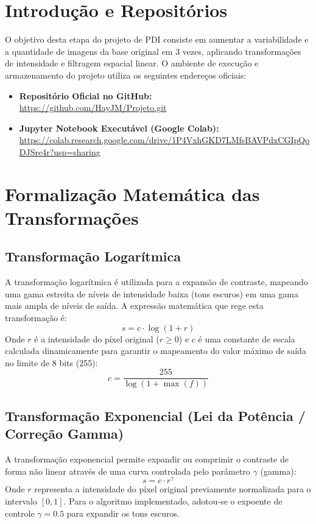\section{Introdução e Repositórios}
O objetivo desta etapa do projeto de PDI consiste em aumentar a variabilidade e a quantidade de imagens da base original em 3 vezes, aplicando transformações de intensidade e filtragem espacial linear. O ambiente de execução e armazenamento do projeto utiliza os seguintes endereços oficiais:
\begin{itemize}
    \item \textbf{Repositório Oficial no GitHub:} \\
    \url{https://github.com/HayJM/Projeto.git}
    \item \textbf{Jupyter Notebook Executável (Google Colab):} \\
    \url{https://colab.research.google.com/drive/1P4VxhGKD7LMfsBAVPdxCGIpQoDJSre4r?usp=sharing}
\end{itemize}

\section{Formalização Matemática das Transformações}

\subsection{Transformação Logarítmica}
A transformação logarítmica é utilizada para a expansão de contraste, mapeando uma gama estreita de níveis de intensidade baixa (tons escuros) em uma gama mais ampla de níveis de saída. A expressão matemática que rege esta transformação é:
\begin{equation}
s = c \cdot \log(1 + r)
\end{equation}
Onde $r$ é a intensidade do píxel original ($r \geq 0$) e $c$ é uma constante de escala calculada dinamicamente para garantir o mapeamento do valor máximo de saída no limite de 8 bits (255):
\begin{equation}
c = \frac{255}{\log(1 + \max(f))}
\end{equation}

\subsection{Transformação Exponencial (Lei da Potência / Correção Gamma)}
A transformação exponencial permite expandir ou comprimir o contraste de forma não linear através de uma curva controlada pelo parâmetro $\gamma$ (gamma):
\begin{equation}
s = c \cdot r^{\gamma}
\end{equation}
Onde $r$ representa a intensidade do píxel original previamente normalizada para o intervalo $[0, 1]$. Para o algoritmo implementado, adotou-se o expoente de controle $\gamma = 0.5$ para expandir os tons escuros.


